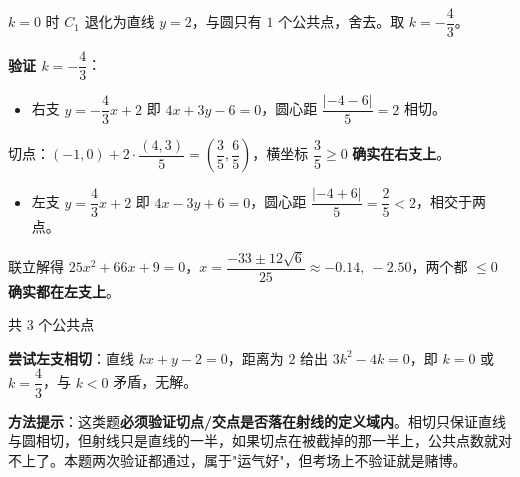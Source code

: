 \begin{answer}
$k=0$ 时 $C_1$ 退化为直线 $y=2$，与圆只有 $1$ 个公共点，舍去。取 $k=-\dfrac43$。

\Needspace{0.25\textheight}

\textbf{验证 $k=-\dfrac43$}：

\begin{itemize}
\item 右支 $y=-\dfrac43x+2$ 即 $4x+3y-6=0$，圆心距 $\dfrac{|-4-6|}5=2$  相切。
\end{itemize}
  切点：$(-1,0)+2\cdot\dfrac{(4,3)}5=\left(\dfrac35,\dfrac65\right)$，横坐标 $\dfrac35\ge0$  \textbf{确实在右支上}。
\begin{itemize}
\item 左支 $y=\dfrac43x+2$ 即 $4x-3y+6=0$，圆心距 $\dfrac{|-4+6|}5=\dfrac25<2$，相交于两点。
\end{itemize}
  联立解得 $25x^{2}+66x+9=0$，$x=\dfrac{-33\pm12\sqrt6}{25}\approx-0.14,\ -2.50$，两个都 $\le0$  \textbf{确实都在左支上}。

共 $3$ 个公共点 

\textbf{尝试左支相切}：直线 $kx+y-2=0$，距离为 $2$ 给出 $3k^{2}-4k=0$，即 $k=0$ 或 $k=\dfrac43$，与 $k<0$ 矛盾，无解。

\begin{gktip}
\textbf{方法提示}：这类题\textbf{必须验证切点/交点是否落在射线的定义域内}。相切只保证直线与圆相切，但射线只是直线的一半，如果切点在被截掉的那一半上，公共点数就对不上了。本题两次验证都通过，属于"运气好"，但考场上不验证就是赌博。
\end{gktip}

\par\medskip

\Needspace{0.5\textheight}



\end{answer}
